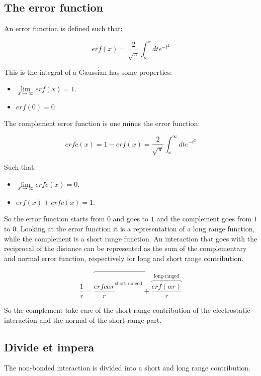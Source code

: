 	\subsection{The error function}
	An error function is defined such that:

	$$erf(x) = \frac{2}{\sqrt{\pi}}\int_o^x dte^{-t^2}$$

	This is the integral of a Gaussian has some properties:

	\begin{multicols}{2}
		\begin{itemize}
			\item $\lim\limits_{x\rightarrow \infty}erf(x) = 1$.
			\item $erf(0) = 0$
		\end{itemize}
	\end{multicols}

	The complement error function is one minus the error function:

	$$erfc(x) = 1- erf(x) = \frac{2}{\sqrt{\pi}}\int_x^\infty dte^{-t^2}$$

	Such that:

	\begin{multicols}{2}
		\begin{itemize}
			\item $\lim\limits_{x\rightarrow\infty} erfc(x) = 0$.
			\item $erf(x) + erfc(x) = 1$.
		\end{itemize}
	\end{multicols}

	So the error function starts from $0$ and goes to $1$ and the complement goes from $1$ to $0$.
	Looking at the error function it is a representation of a long range function, while the complement is a short range function.
	An interaction that goes with the reciprocal of the distance can be represented as the sum of the complementary and normal error function, respectively for long and short range contribution.

	$$\frac{1}{r} = \overbrace{\frac{erfc{\alpha r}}{r}^{\text{short-ranged}} + \overbrace{\frac{erf(\alpha r)}{r}}^{\text{long-ranged}}}$$

	So the complement take care of the short range contribution of the electrostatic interaction and the normal of the short range part.

	\subsection{Divide et impera}
	The non-bonded interaction is divided into a short and long range contribution.

